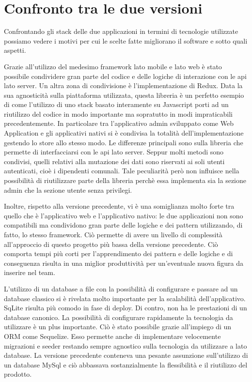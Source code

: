 \section{Confronto tra le due versioni}\vspace{5mm}  

Confrontando gli stack delle due applicazioni in termini di tecnologie utilizzate possiamo vedere i motivi per cui le scelte fatte migliorano il software e sotto quali aspetti. \vspace{5mm}

Grazie all'utilizzo del medesimo framework lato mobile e lato web è stato possibile condividere gran parte del codice e delle logiche di interazione con le api lato server. Un altra zona di condivisione è l'implementazione di Redux. Data la sua agnosticità sulla piattaforma utilizzata, questa libreria è un perfetto esempio di come l'utilizzo di uno stack basato interamente su Javascript porti ad un riutilizzo del codice in modo importante ma sopratutto in modi impraticabili precedentemente. In particolare tra l’applicativo admin sviluppato come Web Application e gli applicativi nativi si è condivisa la totalità dell’implementazione gestendo lo store allo stesso modo. Le differenze principali sono sulla libreria che permette di interfacciarsi con le api lato server. Seppur molti metodi sono condivisi, quelli relativi alla mutazione dei dati sono riservati ai soli utenti autenticati, cioè i dipendenti comunali. Tale peculiarità però non influisce nella possibilità di riutilizzare parte della libreria perchè essa implementa sia la sezione admin che la sezione utente senza privilegi.\vspace{5mm} 

Inoltre, rispetto alla versione precedente, vi è una somiglianza molto forte tra quello che è l’applicativo web e l’applicativo nativo: le due applicazioni non sono compatibili ma condividono gran parte delle logiche e dei pattern utilizzando, di fatto, lo stesso framework. Ciò permette di avere un livello di complessità all'approccio di questo progetto più bassa della versione precedente. Ciò comporta tempi più corti per l'apprendimento dei pattern e delle logiche e di conseguenza risulta in una miglior produttività per un'eventuale nuova figura da inserire nel team.\vspace{5mm}
	
L'utilizzo di un database a file con la possibilità di configurare e passare ad un database classico si è rivelata molto importante per la scalabilità dell’applicativo. SqLite risulta più comodo in fase di deploy. Di contro, non ha le prestazioni di un database canonico. La possibilità di configurare rapidamente la tecnologia da utilizzare è un plus importante. Ciò è stato possibile grazie all’impiego di un ORM come Sequelize\cite{Sequelize}. Esso permette anche di implementare velocemente migrazioni e seeder restando sempre agnostico sulla tecnologia da utilizzare a lato database. La versione precedente conteneva una pesante assunzione sull’utilizzo di un database MySql e ciò abbassava sostanzialmente la flessibilità e il riutilizzo del prodotto.\vspace{5mm}

